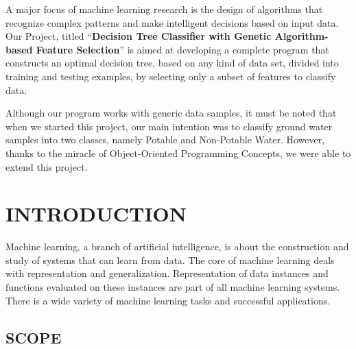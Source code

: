 \documentclass[12pt]{report}
\begin{document}
A major focus of machine learning research is the design of algorithms that recognize complex patterns and make intelligent decisions based on input data. Our Project, titled ``\textbf{Decision Tree Classifier with Genetic Algorithm-based Feature Selection}” is aimed at developing a complete program that constructs an optimal decision tree, based on any kind of data set, divided into training and testing examples, by selecting only a subset of features to classify data. 

Although our program works with generic data samples, it must be noted that when we started this project, our main intention was to classify ground water samples into two classes, namely Potable and Non-Potable Water. However, thanks to the miracle of Object-Oriented Programming Concepts, we were able to extend this project.



\tableofcontents


\newpage

\setcounter{page}{1}

\pagestyle{fancy}
\chead{}
\rfoot{\small{\thepage}}
\renewcommand{\headrulewidth}{0.4pt}
\renewcommand{\footrulewidth}{0.4pt}

\chapter{INTRODUCTION}


Machine learning, a branch of artificial intelligence, is about the construction and study of systems that can learn from data. The core of machine learning deals with representation and generalization. Representation of data instances and functions evaluated on these instances are part of all machine learning systems. There is a wide variety of machine learning tasks and successful applications. 






\section{SCOPE}
\end{document}
